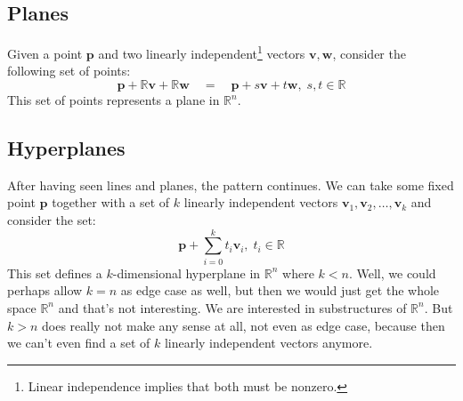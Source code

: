 


\subsection{Planes}
Given a point $\mathbf{p}$ and two linearly independent\footnote{Linear independence implies that both must be nonzero.} vectors $\mathbf{v, w}$, consider the following set of points:
\begin{equation}
 \mathbf{p} + \mathbb{R} \mathbf{v}  + \mathbb{R} \mathbf{w}
 \quad = \quad
 \mathbf{p} + s \mathbf{v} + t \mathbf{w}, \; s,t \in \mathbb{R}
\end{equation}
This set of points represents a plane in $\mathbb{R}^n$. 

\subsection{Hyperplanes}
After having seen lines and planes, the pattern continues. We can take some fixed point $\mathbf{p}$ together with a set of $k$ linearly independent vectors $\mathbf{v}_1, \mathbf{v}_2, \ldots, \mathbf{v}_k$ and consider the set:
\begin{equation}
 \mathbf{p} + \sum_{i=0}^{k} t_i \mathbf{v}_i, \; t_i \in \mathbb{R}
\end{equation}
This set defines a $k$-dimensional hyperplane in $\mathbb{R}^n$ where $k < n$. Well, we could perhaps allow $k=n$ as edge case as well, but then we would just get the whole space $\mathbb{R}^n$ and that's not interesting. We are interested in substructures of $\mathbb{R}^n$. But $k > n$ does really not make any sense at all, not even as edge case, because then we can't even find a set of $k$ linearly independent vectors anymore.




